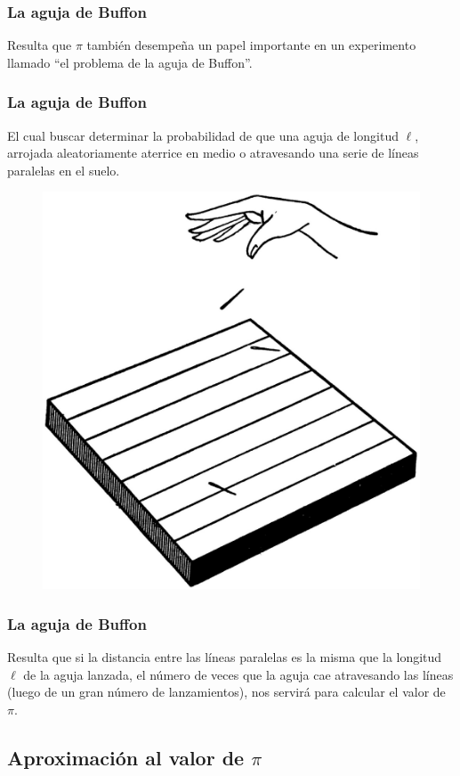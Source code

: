\documentclass[12pt]{beamer}
\begin{document}
\begin{frame}
\frametitle{La aguja de Buffon}
Resulta que $\pi$ también desempeña un papel importante en un experimento llamado \enquote{el problema de la aguja de Buffon}.
\end{frame}
\begin{frame}
\frametitle{La aguja de Buffon}
El cual buscar determinar la probabilidad de que una aguja de longitud $\ell$, arrojada aleatoriamente aterrice en medio o atravesando una serie de líneas paralelas en el suelo.
\end{frame}
\begin{frame}
\begin{figure}
	\centering
	\includegraphics[scale=0.10]{Imagenes/aguja-de-buffon.eps}
\end{figure}
\end{frame}
\begin{frame}
\frametitle{La aguja de Buffon}
Resulta que si la distancia entre las líneas paralelas es la misma que la longitud $\ell$ de la aguja lanzada, el número de veces que la aguja cae atravesando las líneas (luego de un gran número de lanzamientos), nos servirá para calcular el valor de $\pi$.
\end{frame}

\subsection{Aproximación al valor de \texorpdfstring{$\pi$}{pi}}
\end{document}
